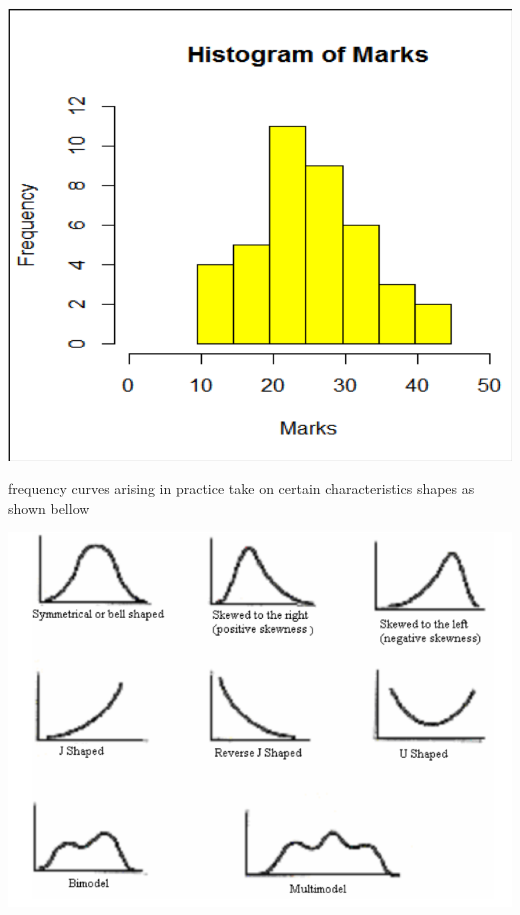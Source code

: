 \documentclass[]{book}
\begin{document}
\begin{center}\includegraphics[width=1\linewidth]{figure/hist} \end{center}

frequency curves arising in practice take on certain characteristics shapes as shown bellow

\begin{center}\includegraphics[width=1\linewidth]{figure/shapes} \end{center}
\end{document}
